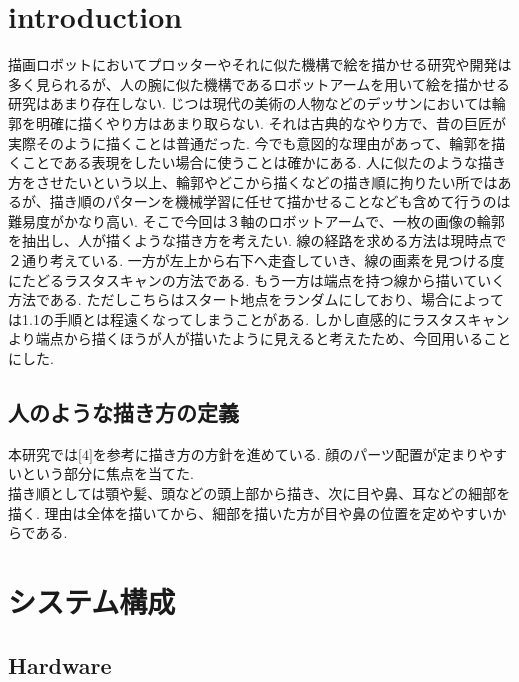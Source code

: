 \documentclass[a4j]{jarticle}			%
\begin{document}
\begin{multicols}{2} %

\section{introduction}
描画ロボットにおいてプロッターやそれに似た機構で絵を描かせる研究や開発は多く見られるが、人の腕に似た機構であるロボットアームを用いて絵を描かせる研究はあまり存在しない.
じつは現代の美術の人物などのデッサンにおいては輪郭を明確に描くやり方はあまり取らない.
それは古典的なやり方で、昔の巨匠が実際そのように描くことは普通だった.
今でも意図的な理由があって、輪郭を描くことである表現をしたい場合に使うことは確かにある.
人に似たのような描き方をさせたいという以上、輪郭やどこから描くなどの描き順に拘りたい所ではあるが、描き順のパターンを機械学習に任せて描かせることなども含めて行うのは難易度がかなり高い.
そこで今回は３軸のロボットアームで、一枚の画像の輪郭を抽出し、人が描くような描き方を考えたい.
線の経路を求める方法は現時点で２通り考えている. 
一方が左上から右下へ走査していき、線の画素を見つける度にたどるラスタスキャンの方法である. 
もう一方は端点を持つ線から描いていく方法である.
ただしこちらはスタート地点をランダムにしており、場合によっては1.1の手順とは程遠くなってしまうことがある. 
しかし直感的にラスタスキャンより端点から描くほうが人が描いたように見えると考えたため、今回用いることにした.

\subsection{人のような描き方の定義}
本研究では$\lbrack4\rbrack$を参考に描き方の方針を進めている.
顔のパーツ配置が定まりやすいという部分に焦点を当てた.\\
描き順としては顎や髪、頭などの頭上部から描き、次に目や鼻、耳などの細部を描く.
理由は全体を描いてから、細部を描いた方が目や鼻の位置を定めやすいからである.

\section{システム構成}
\subsection{Hardware}



\end{multicols}
\end{document}
